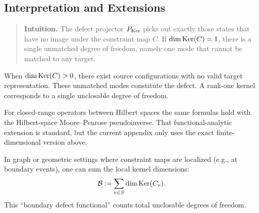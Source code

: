 \subsection{Interpretation and Extensions}

\begin{quote}\small
\textbf{Intuition.} The defect projector $P_{\mathrm{Ker}}$ picks out exactly those
states that have no image under the constraint map $C$. If $\dim\mathrm{Ker}(C) = 1$,
there is a single unmatched degree of freedom, namely one mode that cannot be
matched to any target.
\end{quote}

\begin{remark}
When $\dim\mathrm{Ker}(C) > 0$, there exist source configurations with no valid target representation.
These unmatched modes constitute the defect. A rank-one kernel corresponds to
a single unclosable degree of freedom.
\end{remark}

\begin{remark}
For closed-range operators between Hilbert spaces the same formulas hold with
the Hilbert-space Moore--Penrose pseudoinverse. That functional-analytic
extension is standard, but the current appendix only uses the exact
finite-dimensional version above.
\end{remark}

\begin{remark}
In graph or geometric settings where constraint maps are localized (e.g., at boundary events), one can sum the local kernel dimensions:
\[
\mathcal{B} := \sum_{v \in S} \dim\mathrm{Ker}(C_v).
\]
This ``boundary defect functional'' counts total unclosable degrees of freedom.
\end{remark}

